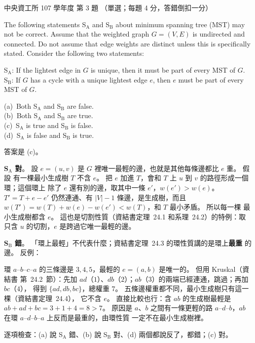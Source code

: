\begin{pastexam}[label={px:ncu-107-dsa-03}]{中央資工所 107 學年度 第 3 題}
（單選；每題 4 分，答錯倒扣一分）

The following statements S$_\mathrm{A}$ and S$_\mathrm{B}$ about minimum spanning tree (MST) may
not be correct. Assume that the weighted graph $G=(V,E)$ is undirected and connected. Do not
assume that edge weights are distinct unless this is specifically stated. Consider the following
two statements:

S$_\mathrm{A}$: If the lightest edge in $G$ is unique, then it must be part of every MST of $G$.\\
S$_\mathrm{B}$: If $G$ has a cycle with a unique lightest edge $e$, then $e$ must be part of
every MST of $G$.

(a)~Both S$_\mathrm{A}$ and S$_\mathrm{B}$ are false.\\
(b)~Both S$_\mathrm{A}$ and S$_\mathrm{B}$ are true.\\
(c)~S$_\mathrm{A}$ is true and S$_\mathrm{B}$ is false.\\
(d)~S$_\mathrm{A}$ is false and S$_\mathrm{B}$ is true.
\end{pastexam}

\begin{pastsoln}
答案是 (c)。

\textbf{S$_\mathrm{A}$ 對}。 設 $e = (u, v)$ 是 $G$ 裡唯一最輕的邊，也就是其他每條邊都比 $e$ 重。 假設
有一棵最小生成樹 $T$ 不含 $e$。 把 $e$ 加進 $T$，會和 $T$ 上 $u$ 到 $v$ 的路徑形成一個環；這個環上
除了 $e$ 還有別的邊，取其中一條 $e'$，$w(e') > w(e)$。 $T' = T + e - e'$ 仍然連通、有
$|V| - 1$ 條邊，是生成樹，而且 $w(T') = w(T) + w(e) - w(e') < w(T)$，和 $T$ 最小矛盾。 所以每一棵
最小生成樹都含 $e$。 這也是切割性質（資結書定理~24.1 和系理~24.2）的特例：取只含 $u$ 的切割，$e$
是跨過它唯一最輕的邊。

\textbf{S$_\mathrm{B}$ 錯}。 「環上最輕」不代表什麼；資結書定理~24.3 的環性質講的是環上\textbf{最重}
的邊。 反例：
\begin{center}
\end{center}
環 $a$--$b$--$c$--$a$ 的三條邊是 $3, 4, 5$，最輕的 $e = (a, b)$ 是唯一的。 但用 Kruskal（資結書
第~24.2~節）：先加 $ad$（$1$）、$db$（$2$）；$ab$（$3$）的兩端已經連通，跳過；再加 $bc$（$4$），
得到 $\{ad, db, bc\}$，總權重 $7$。 五條邊權重都不同，最小生成樹只有這一棵（資結書定理~24.4），
它不含 $e$。 直接比較也行：含 $ab$ 的生成樹最輕是 $ab + ad + bc = 3 + 1 + 4 = 8 > 7$。 原因是
$a$、$b$ 之間有一條更輕的路 $a$--$d$--$b$，$ab$ 在環 $a$--$d$--$b$--$a$ 上反而是最重的，由環性質
一定不在最小生成樹裡。

逐項檢查：(a) 說 S$_\mathrm{A}$ 錯、(b) 說 S$_\mathrm{B}$ 對、(d) 兩個都說反了，都錯；(c) 對。
\end{pastsoln}
